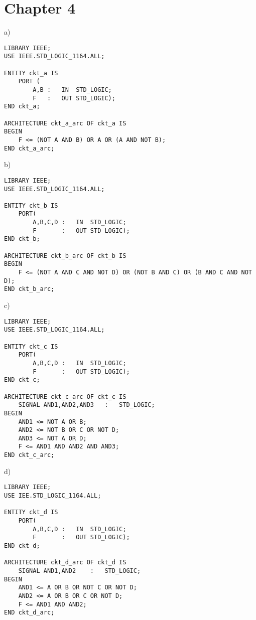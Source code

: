 \section*{Chapter 4}
\begin{enumerate}
	\begin{minipage}{1\linewidth}
	\item a)
		\begin{lstlisting}[]
LIBRARY IEEE;
USE IEEE.STD_LOGIC_1164.ALL;

ENTITY ckt_a IS
	PORT (
		A,B	:	IN	STD_LOGIC;
		F	:	OUT	STD_LOGIC);
END ckt_a;

ARCHITECTURE ckt_a_arc OF ckt_a IS
BEGIN
	F <= (NOT A AND B) OR A OR (A AND NOT B);
END ckt_a_arc;
		\end{lstlisting}
	\end{minipage}

	\begin{minipage}{1\linewidth}

		b)
		\begin{lstlisting}[]
LIBRARY IEEE;
USE IEEE.STD_LOGIC_1164.ALL;

ENTITY ckt_b IS
	PORT(
		A,B,C,D	:	IN	STD_LOGIC;
		F		:	OUT	STD_LOGIC);
END ckt_b;

ARCHITECTURE ckt_b_arc OF ckt_b IS
BEGIN
	F <= (NOT A AND C AND NOT D) OR (NOT B AND C) OR (B AND C AND NOT D);
END ckt_b_arc;
		\end{lstlisting}
	\end{minipage}

	\begin{minipage}{1\linewidth}
		c)
		\begin{lstlisting}[]
LIBRARY IEEE;
USE IEEE.STD_LOGIC_1164.ALL;

ENTITY ckt_c IS
	PORT(
		A,B,C,D	:	IN	STD_LOGIC;
		F		:	OUT	STD_LOGIC);
END ckt_c;

ARCHITECTURE ckt_c_arc OF ckt_c IS
	SIGNAL AND1,AND2,AND3	:	STD_LOGIC;
BEGIN
	AND1 <= NOT A OR B;
	AND2 <= NOT B OR C OR NOT D;
	AND3 <= NOT A OR D;
	F <= AND1 AND AND2 AND AND3;
END ckt_c_arc;
		\end{lstlisting}
	\end{minipage}

	\begin{minipage}{1\linewidth}
		d)
		\begin{lstlisting}[]
LIBRARY IEEE;
USE IEE.STD_LOGIC_1164.ALL;

ENTITY ckt_d IS
	PORT(
		A,B,C,D	:	IN	STD_LOGIC;
		F		:	OUT	STD_LOGIC);
END ckt_d;

ARCHITECTURE ckt_d_arc OF ckt_d IS
	SIGNAL AND1,AND2	:	STD_LOGIC;
BEGIN
	AND1 <= A OR B OR NOT C OR NOT D;
	AND2 <= A OR B OR C OR NOT D;
	F <= AND1 AND AND2;
END ckt_d_arc;
		\end{lstlisting}
	\end{minipage}


\end{enumerate}
